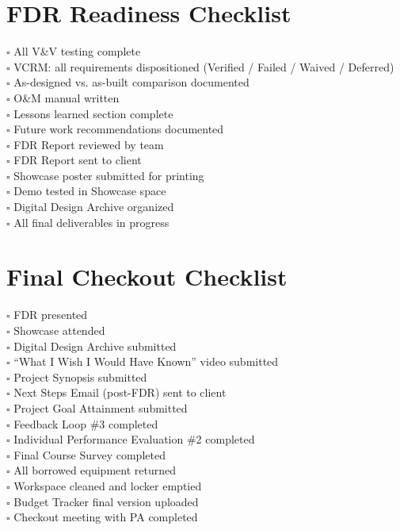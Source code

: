 \section*{FDR Readiness Checklist}
$\square$ All V\&V testing complete \\
$\square$ VCRM: all requirements dispositioned (Verified / Failed / Waived / Deferred) \\
$\square$ As-designed vs. as-built comparison documented \\
$\square$ O\&M manual written \\
$\square$ Lessons learned section complete \\
$\square$ Future work recommendations documented \\
$\square$ FDR Report reviewed by team \\
$\square$ FDR Report sent to client \\
$\square$ Showcase poster submitted for printing \\
$\square$ Demo tested in Showcase space \\
$\square$ Digital Design Archive organized \\
$\square$ All final deliverables in progress

\section*{Final Checkout Checklist}
$\square$ FDR presented \\
$\square$ Showcase attended \\
$\square$ Digital Design Archive submitted \\
$\square$ ``What I Wish I Would Have Known'' video submitted \\
$\square$ Project Synopsis submitted \\
$\square$ Next Steps Email (post-FDR) sent to client \\
$\square$ Project Goal Attainment submitted \\
$\square$ Feedback Loop \#3 completed \\
$\square$ Individual Performance Evaluation \#2 completed \\
$\square$ Final Course Survey completed \\
$\square$ All borrowed equipment returned \\
$\square$ Workspace cleaned and locker emptied \\
$\square$ Budget Tracker final version uploaded \\
$\square$ Checkout meeting with PA completed


